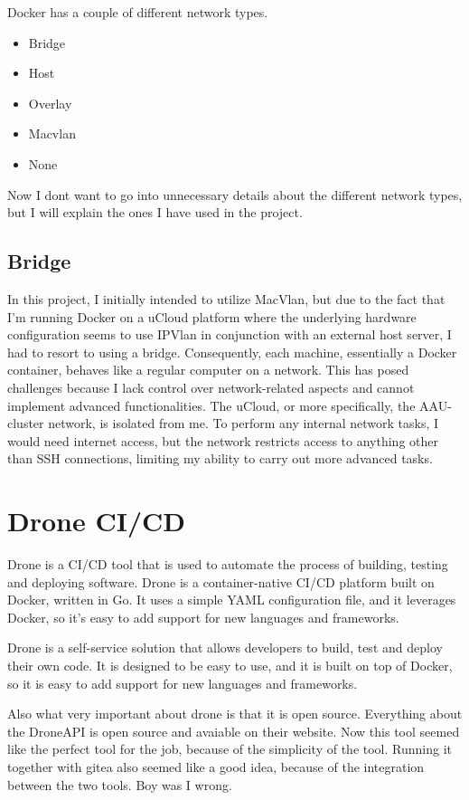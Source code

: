 Docker has a couple of different network types.
\begin{itemize}
    \item Bridge
    \item Host
    \item Overlay
    \item Macvlan
    \item None
\end{itemize}

Now I dont want to go into unnecessary details about the different network types, but I will explain the ones I have used in the project.
\subsection{Bridge}
In this project, I initially intended to utilize MacVlan,
but due to the fact that I'm running Docker on a uCloud platform where
the underlying hardware configuration seems to use IPVlan in conjunction with an external host server,
I had to resort to using a bridge. Consequently, each machine, essentially a Docker container,
behaves like a regular computer on a network. This has posed challenges because I
lack control over network-related aspects and cannot implement advanced functionalities.
The uCloud, or more specifically, the AAU-cluster network, is isolated from me. 
To perform any internal network tasks, I would need internet access, but the network restricts access
to anything other than SSH connections,
limiting my ability to carry out more advanced tasks.


\section{Drone CI/CD}

Drone\cite{droneio} is a CI/CD tool that is used to automate the process of building, testing and deploying software.
Drone is a container-native CI/CD platform built on Docker, written in Go. It uses a simple YAML configuration file,
and it leverages Docker, so it's easy to add support for new languages and frameworks.

Drone is a self-service solution that allows developers to build, test and deploy their own code.
It is designed to be easy to use, and it is built on top of Docker, so it is easy to add support for new languages and frameworks.

Also what very important about drone is that it is open source. Everything about the DroneAPI is open source and 
avaiable on their website. Now this tool seemed like the perfect tool for the job, because of the simplicity of the tool.
Running it together with gitea also seemed like a good idea, because of the integration between the two tools.
Boy was I wrong. 

